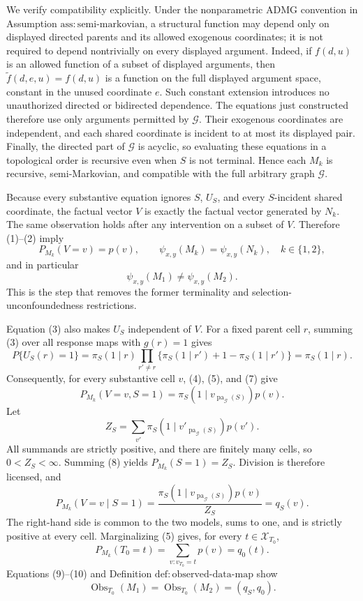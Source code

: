 We verify compatibility explicitly. Under the nonparametric ADMG convention in Assumption \(\mathrm{ass{:}semi\text{-}markovian}\), a structural function may depend only on displayed directed parents and its allowed exogenous coordinates; it is not required to depend nontrivially on every displayed argument. Indeed, if \(f(d,u)\) is an allowed function of a subset of displayed arguments, then \(\widetilde f(d,e,u)=f(d,u)\) is a function on the full displayed argument space, constant in the unused coordinate \(e\). Such constant extension introduces no unauthorized directed or bidirected dependence. The equations just constructed therefore use only arguments permitted by \(\mathcal G\). Their exogenous coordinates are independent, and each shared coordinate is incident to at most its displayed pair. Finally, the directed part of \(\mathcal G\) is acyclic, so evaluating these equations in a topological order is recursive even when \(S\) is not terminal. Hence each \(M_k\) is recursive, semi-Markovian, and compatible with the full arbitrary graph \(\mathcal G\).

Because every substantive equation ignores \(S\), \(U_S\), and every \(S\)-incident shared coordinate, the factual vector \(V\) is exactly the factual vector generated by \(N_k\). The same observation holds after any intervention on a subset of \(V\). Therefore (1)--(2) imply
\[
 P_{M_k}(V=v)=p(v),
 \qquad
 \psi_{x,y}(M_k)=\psi_{x,y}(N_k),
 \quad k\in\{1,2\},
 \tag{5}
\]
and in particular
\[
 \psi_{x,y}(M_1)\ne\psi_{x,y}(M_2).
 \tag{6}
\]
This is the step that removes the former terminality and selection-unconfoundedness restrictions.

Equation (3) also makes \(U_S\) independent of \(V\). For a fixed parent cell \(r\), summing (3) over all response maps with \(g(r)=1\) gives
\[
 P\{U_S(r)=1\}
 =\pi_S(1\mid r)
 \prod_{r'\ne r}\{\pi_S(1\mid r')+1-\pi_S(1\mid r')\}
 =\pi_S(1\mid r).
 \tag{7}
\]
Consequently, for every substantive cell \(v\), (4), (5), and (7) give
\[
 P_{M_k}(V=v,S=1)
 =\pi_S(1\mid v_{\operatorname{pa}_{\mathcal G}(S)})p(v).
 \tag{8}
\]
Let
\[
 Z_S=\sum_{v'}\pi_S(1\mid v'_{\operatorname{pa}_{\mathcal G}(S)})p(v').
\]
All summands are strictly positive, and there are finitely many cells, so \(0<Z_S<\infty\). Summing (8) yields \(P_{M_k}(S=1)=Z_S\). Division is therefore licensed, and
\[
 P_{M_k}(V=v\mid S=1)
 =\frac{\pi_S(1\mid v_{\operatorname{pa}_{\mathcal G}(S)})p(v)}{Z_S}
 =q_S(v).
 \tag{9}
\]
The right-hand side is common to the two models, sums to one, and is strictly positive at every cell. Marginalizing (5) gives, for every \(t\in\mathcal X_{T_0}\),
\[
 P_{M_k}(T_0=t)
 =\sum_{v:v_{T_0}=t}p(v)
 =q_0(t).
 \tag{10}
\]
Equations (9)--(10) and Definition \(\mathrm{def{:}observed\text{-}data\text{-}map}\) show
\[
 \operatorname{Obs}_{T_0}(M_1)
 =\operatorname{Obs}_{T_0}(M_2)
 =(q_S,q_0).
 \tag{11}
\]

